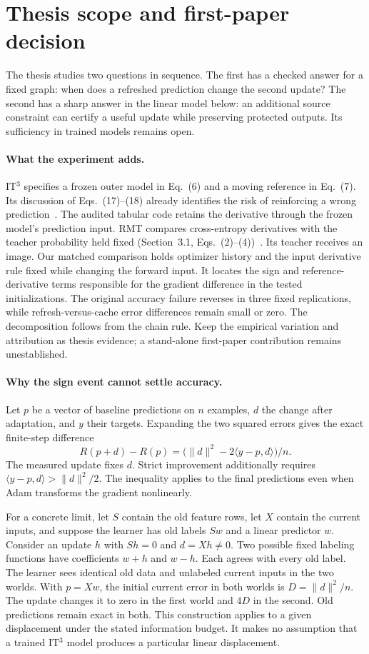 \documentclass[11pt,a4paper]{article}
\begin{document}
\section{Thesis scope and first-paper decision}
The thesis studies two questions in sequence. The first has a checked
answer for a fixed graph: when does a refreshed prediction change the
second update? The second has a sharp answer in the linear model below: an additional
source constraint can certify a useful update while preserving protected
outputs. Its sufficiency in trained models remains open.

\paragraph{What the experiment adds.}
IT$^3$ specifies a frozen outer model in Eq.~(6) and a moving reference in
Eq.~(7). Its discussion of Eqs.~(17)--(18) already identifies the risk of
reinforcing a wrong prediction~\cite{it3}. The audited tabular code retains
the derivative through the frozen model's prediction input. RMT compares
cross-entropy derivatives with the teacher probability held fixed
(Section~3.1, Eqs.~(2)--(4))~\cite{rmt}. Its teacher receives an image.
Our matched comparison holds optimizer history and the input derivative
rule fixed while changing the forward input. It locates the sign and
reference-derivative terms responsible for the gradient difference in
the tested initializations. The original accuracy failure reverses in
three fixed replications, while refresh-versus-cache error differences
remain small or zero. The decomposition follows from the chain rule.
Keep the empirical variation and attribution as thesis evidence; a
stand-alone first-paper contribution remains unestablished.

\paragraph{Why the sign event cannot settle accuracy.}
Let $p$ be a vector of baseline predictions on $n$ examples, $d$ the
change after adaptation, and $y$ their targets. Expanding the two squared
errors gives the exact finite-step difference
\[
 R(p+d)-R(p)=\bigl(\|d\|^2-2\langle y-p,d\rangle\bigr)/n .
\]
The measured update fixes $d$. Strict improvement additionally requires
$\langle y-p,d\rangle>\|d\|^2/2$. The inequality applies to the final
predictions even when Adam transforms the gradient nonlinearly.

For a concrete limit, let $S$ contain the old feature rows, let $X$ contain
the current inputs, and suppose the learner has old labels $Sw$ and a
linear predictor $w$. Consider an update $h$ with $Sh=0$ and $d=Xh\ne0$.
Two possible fixed labeling functions have coefficients $w+h$ and $w-h$.
Each agrees with every old label. The learner sees identical old data and
unlabeled current inputs in the two worlds. With $p=Xw$, the initial
current error in both worlds is $D=\|d\|^2/n$. The update changes it to
zero in the first world and $4D$ in the second. Old predictions remain
exact in both. This construction applies to a given displacement under
the stated information budget. It makes no assumption that a trained
IT$^3$ model produces a particular linear displacement.
\end{document}
